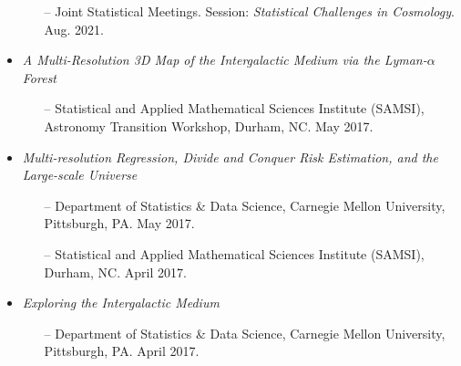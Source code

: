 \documentclass[letterpaper,10pt]{article}
\begin{document}
\begin{itemize}
\vspace{-0.05cm}

\begin{itemize}
\item[--] Joint Statistical Meetings. Session: {\it Statistical Challenges in Cosmology}. Aug. 2021.
\end{itemize}


\vspace{0.1cm}


\item {\it A Multi-Resolution 3D Map of the Intergalactic Medium via the Lyman-$\alpha$ Forest}

\vspace{-0.05cm}

\begin{itemize}
\item[--] Statistical and Applied Mathematical Sciences Institute (SAMSI), Astronomy Transition Workshop, Durham, NC. May 2017.
\end{itemize}


\vspace{0.1cm}


\item {\it Multi-resolution Regression, Divide and Conquer Risk Estimation, and the Large-scale Universe}

\vspace{-0.05cm}

\begin{itemize}
\item[--] Department of Statistics \& Data Science, Carnegie Mellon University, Pittsburgh, PA. May 2017.

\vspace{0.05cm}

\item[--] Statistical and Applied Mathematical Sciences Institute (SAMSI), Durham, NC. April 2017.

\end{itemize}


\vspace{0.1cm}


\item {\it Exploring the Intergalactic Medium}

\vspace{-0.05cm}

\begin{itemize}
\item[--] Department of Statistics \& Data Science, Carnegie Mellon University, Pittsburgh, PA. April 2017.
\end{itemize}


\end{itemize}
\end{document}
